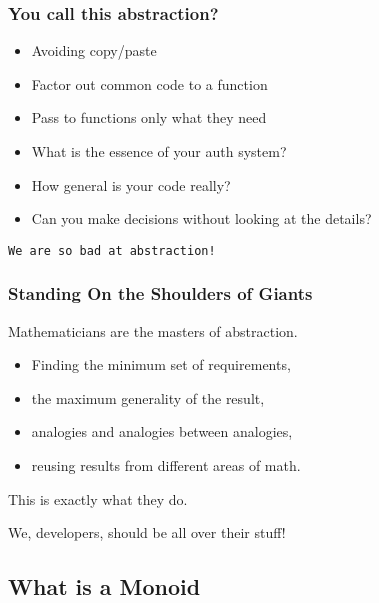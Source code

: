 \documentclass{beamer}
\begin{document}
\begin{frame}
  \frametitle{You call this abstraction?}
  \begin{itemize}
    \item Avoiding copy/paste
    \item Factor out common code to a function
    \item Pass to functions only what they need
      \pause
    \item What is the \alert{essence} of your auth system?
    \item How \alert{general} is your code really?
    \item Can you make decisions without looking at the \alert{details}?
  \end{itemize}

  \vspace{3ex}
  \pause

  \begin{block}{}
  \texttt{\LARGE{We are so bad at abstraction!}}
  \end{block}

\end{frame}

\begin{frame}
  \frametitle{Standing On the Shoulders of Giants}
  Mathematicians are the \alert{masters of abstraction.}
  \begin{itemize}
  \item Finding the minimum set of requirements,
  \item the maximum generality of the result,
  \item analogies and analogies between analogies,
  \item reusing results from different areas of math.
  \end{itemize}

  \begin{block}{}
  This is exactly what they do.
  \end{block}

  \begin{block}{}
  We, developers, should be all over their stuff!
  \end{block}
\end{frame}


\subsection{What is a Monoid}
\end{document}
